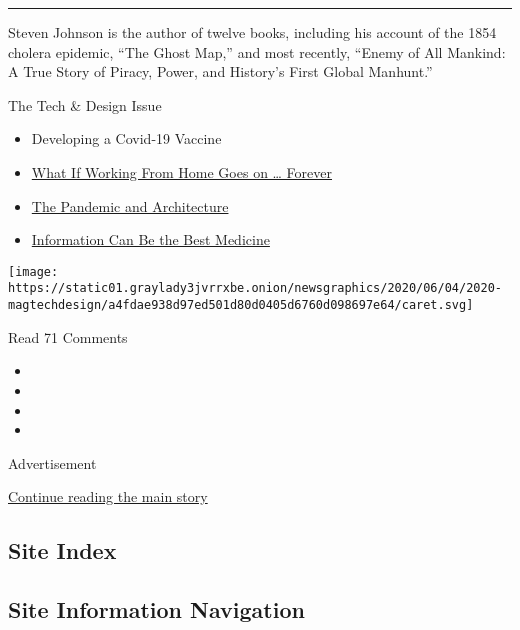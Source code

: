 \begin{center}\rule{0.5\linewidth}{\linethickness}\end{center}

Steven Johnson is the author of twelve books, including his account of
the 1854 cholera epidemic, ``The Ghost Map,'' and most recently, ``Enemy
of All Mankind: A True Story of Piracy, Power, and History's First
Global Manhunt.''

The Tech \& Design Issue

\begin{itemize}
\tightlist
\item
  Developing a Covid-19 Vaccine
\item
  \href{https://www.nytimes3xbfgragh.onion/interactive/2020/06/09/magazine/remote-work-covid.html}{What
  If Working From Home Goes on \ldots{} Forever}
\item
  \href{https://www.nytimes3xbfgragh.onion/interactive/2020/06/09/magazine/architecture-covid.html}{The
  Pandemic and Architecture}
\item
  \href{https://www.nytimes3xbfgragh.onion/interactive/2020/06/10/magazine/covid-data.html}{Information
  Can Be the Best Medicine}
\end{itemize}

\protect\hyperlink{}{} \protect\hyperlink{}{}

\texttt{[image: https://static01.graylady3jvrrxbe.onion/newsgraphics/2020/06/04/2020-magtechdesign/a4fdae938d97ed501d80d0405d6760d098697e64/caret.svg]}

Read 71 Comments

\begin{itemize}
\item
\item
\item
\item
\end{itemize}

Advertisement

\protect\hyperlink{after-bottom}{Continue reading the main story}

\hypertarget{site-index}{%
\subsection{Site Index}\label{site-index}}

\hypertarget{site-information-navigation}{%
\subsection{Site Information
Navigation}\label{site-information-navigation}}

